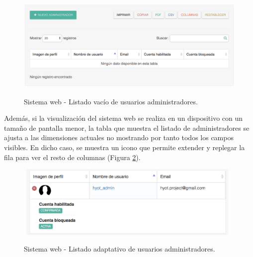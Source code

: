 \documentclass[12pt,a4paper, twoside]{report}
\begin{document}
\begin{itemize}
\begin{itemize}
				\begin{figure}[!ht]   
					\caption{Sistema web - Listado vacío de usuarios administradores.} 
					\begin{center}
		 				\includegraphics[width=15cm, height=4.5cm]{Images/userGuide/web/adminListEmpty} \\
						\label{fig:web_adminListEmpty} 
					\end{center}  	
				\end{figure}
				
				Además, si la visualización del sistema web se realiza en un dispositivo con un tamaño de pantalla menor, la tabla que muestra el listado de administradores se ajusta a las dimensiones actuales no mostrando por tanto todos los campos visibles. En dicho caso, se muestra un icono que permite extender y replegar la fila para ver el resto de columnas (Figura \ref{fig:web_adminListResponsive}).
				
				\begin{figure}[!ht]   
					\caption{Sistema web - Listado adaptativo de usuarios administradores.} 
					\begin{center}
		 				\includegraphics[width=11cm, height=3.5cm]{Images/userGuide/web/adminListResponsive} \\
						\label{fig:web_adminListResponsive} 
					\end{center}  	
				\end{figure}


\end{itemize}
\end{itemize}
\end{document}
